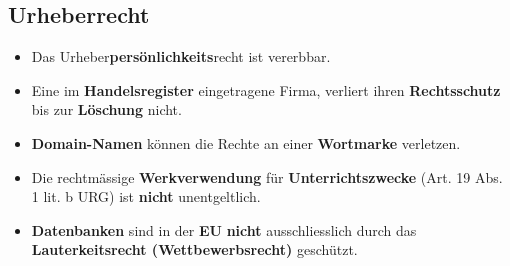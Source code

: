\subsection{Urheberrecht}
\begin{itemize}
	\item Das Urheber\textbf{persönlichkeits}recht ist vererbbar.
	\item Eine im \textbf{Handelsregister} eingetragene Firma, verliert ihren \textbf{Rechtsschutz} bis zur \textbf{Löschung} nicht.
	\item \textbf{Domain-Namen} können die Rechte an einer \textbf{Wortmarke} verletzen.
	\item Die rechtmässige \textbf{Werkverwendung} für \textbf{Unterrichtszwecke} (Art. 19 Abs. 1 lit. b URG) ist \textbf{nicht} unentgeltlich.
	\item \textbf{Datenbanken} sind in der \textbf{EU} \textbf{nicht} ausschliesslich durch das \textbf{Lauterkeitsrecht (Wettbewerbsrecht)} geschützt.
\end{itemize}

